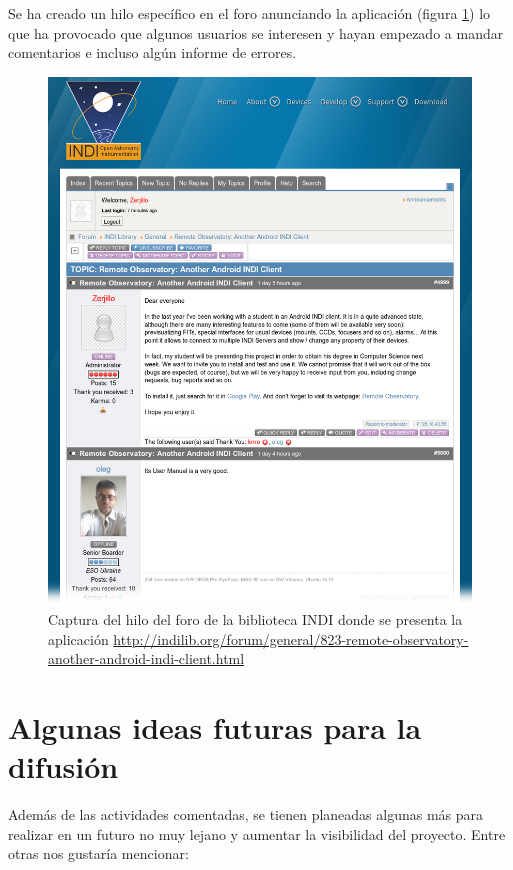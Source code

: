 Se ha creado un hilo específico en el foro anunciando la aplicación (figura \ref{fig:indiForum}) lo que ha provocado que algunos usuarios se interesen y hayan empezado a mandar comentarios e incluso algún informe de errores.

\begin{figure}
 \centering
 \includegraphics[width=12cm]{../images/indiForum2.png}
 \caption[Captura del hilo del foro de la biblioteca INDI donde se presenta la aplicación]{Captura del hilo del foro de la biblioteca INDI donde se presenta la aplicación \protect\href{http://indilib.org/forum/general/823-remote-observatory-another-android-indi-client.html}{http://indilib.org/forum/general/823-remote-observatory-another-android-indi-client.html}}
 \label{fig:indiForum}
\end{figure}



\section{Algunas ideas futuras para la difusión}

Además de las actividades comentadas, se tienen planeadas algunas más para realizar en un futuro no muy lejano y aumentar la visibilidad del proyecto. Entre otras nos gustaría mencionar:

